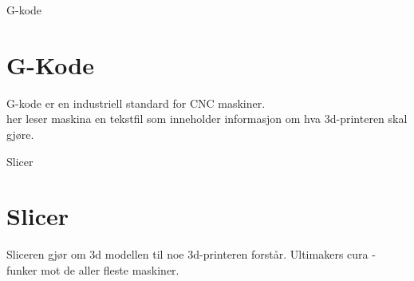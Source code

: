\documentclass[12pt]{beamer}
\begin{document}
\begin{frame}{G-kode}
\section{G-Kode}
G-kode er en industriell standard for CNC maskiner. \\
her leser maskina en tekstfil som inneholder informasjon om hva 3d-printeren skal gjøre.
\end{frame}

\begin{frame}{Slicer}
\section{Slicer}
Sliceren gjør om 3d modellen til noe 3d-printeren forstår.
Ultimakers cura - funker mot de aller fleste maskiner.
\end{frame}
\end{document}
